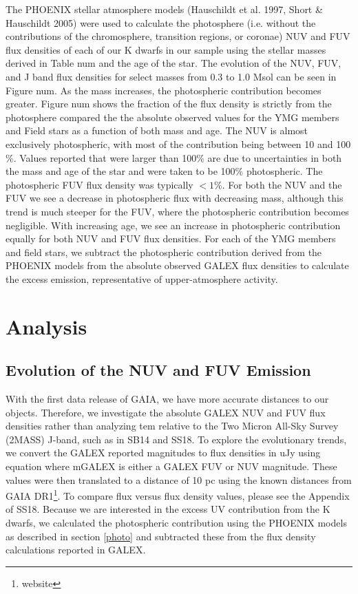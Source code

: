 \documentclass[twocolumn]{aastex62}
\begin{document}
The PHOENIX stellar atmosphere models (Hauschildt et al. 1997, Short & Hauschildt 2005) were used to calculate the photosphere (i.e. without the contributions of the chromosphere, transition regions, or coronae) NUV and FUV flux densities of each of our K dwarfs in our sample using the stellar masses derived in Table num and the age of the star. The evolution of the NUV, FUV, and J band flux densities for select masses from 0.3 to 1.0 Msol can be seen in Figure num.  As the mass increases, the photospheric contribution becomes greater. 
Figure num shows the fraction of the flux density is strictly from the photosphere compared the the absolute observed values for the YMG members and Field stars as a function of both mass and age. The NUV is almost exclusively photospheric, with most of the contribution being between 10 and 100$\%$. Values reported that were larger than 100$\%$ are due to uncertainties in both the mass and age of the star and were taken to be 100$\%$ photospheric. The photospheric FUV flux density was typically $<1\%$. For both the NUV and the FUV we see a decrease in photospheric flux with decreasing mass, although this trend is much steeper for the FUV, where the photospheric contribution becomes negligible. With increasing age, we see an increase in photospheric contribution equally for both NUV and FUV flux densities. 
For each of the YMG members and field stars, we subtract the photospheric contribution derived from the PHOENIX models from the absolute observed GALEX flux densities to calculate the excess emission, representative of upper-atmosphere activity. 




\section{Analysis}








\subsection{Evolution of the NUV and FUV Emission}


With the first data release of GAIA, we have more accurate distances to our objects. Therefore, we investigate the absolute GALEX NUV and FUV flux densities rather than analyzing tem relative to the Two Micron All-Sky Survey (2MASS) J-band, such as in SB14 and SS18. To explore the evolutionary trends, we convert the GALEX reported magnitudes to flux densities in uJy using
equation
where mGALEX is either a GALEX FUV or NUV magnitude. These values were then translated to a distance of 10 pc using the known distances from GAIA DR1\footnote{website}. To compare flux versus flux density values, please see the Appendix of SS18. 
Because we are interested in the excess UV contribution from the K dwarfs, we calculated the photospheric contribution using the PHOENIX models as described in section \ref{photo} and subtracted these from the flux density calculations reported in GALEX. 
\end{document}
